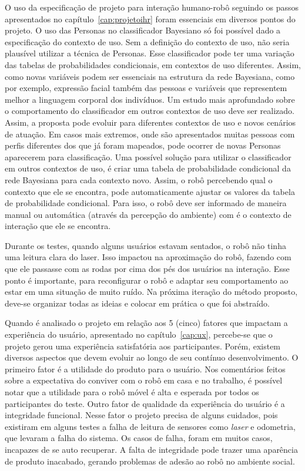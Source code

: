 O uso da especificação de projeto para interação humano-robô seguindo os passos apresentados no capítulo~\ref{cap:projetoihr} foram essenciais em diversos pontos do projeto. O uso das Personas no classificador Bayesiano só foi possível dado a especificação do contexto de uso. Sem a definição do contexto de uso, não seria plausível utilizar a técnica de Personas. Esse classificador pode ter uma variação das tabelas de probabilidades condicionais, em contextos de uso diferentes. Assim, como novas variáveis podem ser essenciais na estrutura da rede Bayesiana, como por exemplo, expressão facial também das pessoas e variáveis que representem melhor a linguagem corporal dos indivíduos. Um estudo mais aprofundado sobre o comportamento do classificador em outros contextos de uso deve ser realizado. Assim, a proposta pode evoluir para diferentes contextos de uso e novos cenários de atuação. Em casos mais extremos, onde são apresentados muitas pessoas com perfis diferentes dos que já foram mapeados, pode ocorrer de novas Personas aparecerem para classificação. Uma possível solução para utilizar o classificador em outros contextos de uso, é criar uma tabela de probabilidade condicional da rede Bayesiana para cada contexto novo. Assim, o robô percebendo qual o contexto que ele se encontra, pode automaticamente ajustar os valores da tabela de probabilidade condicional. Para isso, o robô deve ser informado de maneira manual ou automática (através da percepção do ambiente) com é o contexto de interação que ele se encontra.

Durante os testes, quando alguns usuários estavam sentados, o robô não tinha uma leitura clara do laser. Isso impactou na aproximação do robô, fazendo com que ele passasse com as rodas por cima dos pés dos usuários na interação. Esse ponto é importante, para reconfigurar o robô e adaptar seu comportamento ao estar em uma situação de muito ruído. Na próxima iteração do método proposto, deve-se organizar todas as ideias e colocar em prática o que foi abstraído.

Quando é analisado o projeto em relação aos 5 (cinco) fatores que impactam a experiência do usuário, apresentado no capítulo~\ref{cap:ux}, percebe-se que o projeto gerou uma experiência satisfatória aos participantes. Porém, existem diversos aspectos que devem evoluir ao longo de seu contínuo desenvolvimento. O primeiro fator é a utilidade do produto para o usuário. Nos comentários feitos sobre a expectativa do conviver com o robô em casa e no trabalho, é possível notar que a utilidade para o robô móvel é alta e esperada por todos os participantes do teste. Outro fator de qualidade da experiência do usuário é a integridade funcional. Nesse fator o projeto precisa de alguns cuidados, pois existiram em alguns testes a falha de leitura de sensores como \emph{laser} e odometria, que levaram a falha do sistema. Os casos de falha, foram em muitos casos, incapazes de se auto recuperar. A falta de integridade pode trazer uma aparência de produto inacabado, gerando problemas de adesão ao robô no ambiente social.

